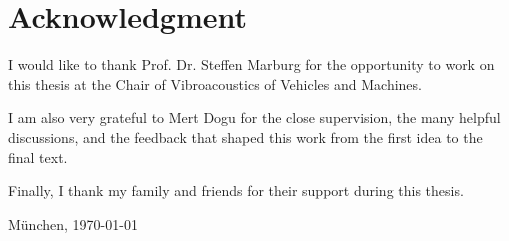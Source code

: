 \section*{Acknowledgment}

I would like to thank Prof. Dr. Steffen Marburg for the opportunity to work on this thesis at the Chair of Vibroacoustics of Vehicles and Machines.

I am also very grateful to Mert Dogu for the close supervision, the many helpful discussions, and the feedback that shaped this work from the first idea to the final text.

Finally, I thank my family and friends for their support during this thesis.

\vspace*{28pt}

München, \today\newpage
